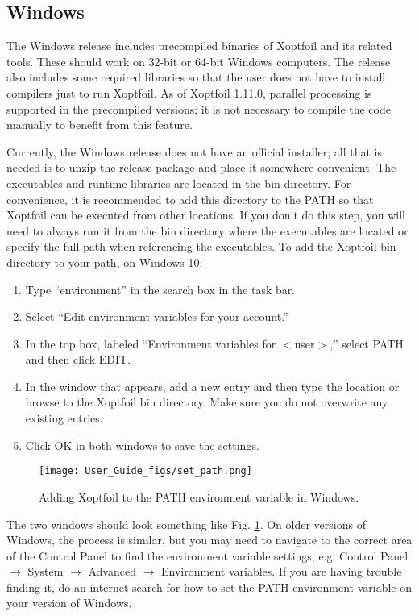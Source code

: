 \documentclass[11pt]{article}
\begin{document}
\subsection{Windows}\label{sec:install_windows}

The Windows release includes precompiled binaries of Xoptfoil and its related tools. These
should work on 32-bit or 64-bit Windows computers. The release also includes some required
libraries so that the user does not have to install compilers just to run Xoptfoil. As of
Xoptfoil 1.11.0, parallel processing is supported in the precompiled versions; it is not
necessary to compile the code manually to benefit from this feature.

Currently, the Windows release does not have an official installer; all that is needed is
to unzip the release package and place it somewhere convenient. The executables and
runtime libraries are located in the bin directory. For convenience, it is recommended to
add this directory to the PATH so that Xoptfoil can be executed from other locations. If
you don't do this step, you will need to always run it from the bin directory where the
executables are located or specify the full path when referencing the executables.
To add the Xoptfoil bin directory to your path, on Windows 10:

\begin{enumerate}
  \item{Type ``environment'' in the search box in the task bar.}
  \item{Select ``Edit environment variables for your account.''}
  \item{In the top box, labeled ``Environment variables for $<$user$>$,'' select PATH and
then click EDIT.}
  \item{In the window that appears, add a new entry and then type the location or browse to
the Xoptfoil bin directory. Make sure you do not overwrite any existing entries.}
  \item{Click OK in both windows to save the settings.}
\end{enumerate}

\begin{figure}
\centering
  \texttt{[image: User\_Guide\_figs/set\_path.png]}
\caption{Adding Xoptfoil to the PATH environment variable in Windows.}
\label{fig:set_path}
\end{figure}

The two windows should look something like Fig. \ref{fig:set_path}.
On older versions of Windows, the process is similar, but you may need to navigate to the
correct area of the Control Panel to find the environment variable settings, e.g. Control
Panel $\rightarrow$ System $\rightarrow$ Advanced $\rightarrow$ Environment variables. If
you are having trouble finding it, do an internet search for how to set the PATH
environment variable on your version of Windows.
\end{document}

